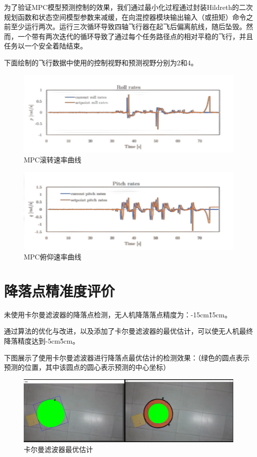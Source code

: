 为了验证MPC模型预测控制的效果，我们通过最小化过程通过封装Hildreth的二次规划函数和状态空间模型参数来减缓，在向混控器模块输出输入（或扭矩）命令之前至少运行两次。运行三次循环导致四轴飞行器在起飞后偏离航线，随后坠毁。然而，一个带有两次迭代的循环导致了通过每个任务路径点的相对平稳的飞行，并且任务以一个安全着陆结束。

下面绘制的飞行数据中使用的控制视野和预测视野分别为2和4。

\begin{figure}[ht]
  \centering
  \includegraphics[width=0.8\linewidth]{./Figure/MPC-Roll-Rates.png}
  \caption{MPC滚转速率曲线}\label{Fig:xd1}
\end{figure}

\begin{figure}[ht]
  \centering
  \includegraphics[width=0.8\linewidth]{./Figure/MPC-Pitch-Rates.png}
  \caption{MPC俯仰速率曲线}\label{Fig:xd1}
\end{figure}

\section{降落点精准度评价}

未使用卡尔曼滤波器的降落点检测，无人机降落落点精度为：-15cm\~15cm。

通过算法的优化与改进，以及添加了卡尔曼滤波器的最优估计，可以使无人机最终降落精度达到-5cm\~5cm。

下图展示了使用卡尔曼滤波器进行降落点最优估计的检测效果：（绿色的圆点表示预测的位置，其中该圆点的圆心表示预测的中心坐标）

\begin{figure}[ht]
  \centering
  \includegraphics[width=0.8\linewidth]{./Figure/Kalman_Prediction.png}
  \caption{卡尔曼滤波器最优估计}\label{Fig:xd1}
\end{figure}
